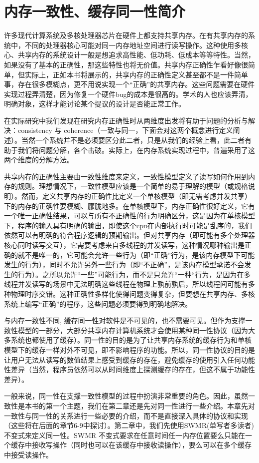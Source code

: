 \documentclass[UTF-8]{ctexrep}
\begin{document}
\chapter{内存一致性、缓存同一性简介}
许多现代计算系统及多核处理器芯片在硬件上都支持共享内存。在有共享内存的系统中，不同的处理器核心可能对同一内存地址空间进行读写操作。这种使用多核心、共享内存的系统设计一般是想追求高性能、低功耗、低成本等等特性。当然，如果没有了基本的正确性，那这些特性也将无价值。共享内存正确性乍看好像很简单，但实际上，正如本书将展示的，共享内存的正确性定义甚至都不是一件简单事，存在很多模糊点，更不用说实现一个“正确”的共享内存。这些问题需要在硬件实现过程弄清楚，因为修复一个硬件bug的成本是很高的。学术的人也应该弄清，明确对象，这样才能讨论某个提议的设计是否能正常工作。
\par 在实际研究中我们发现在研究内存正确性时从两维度出发将有助于问题的分析与解决：consistency 与 coherence（一致与同一，下面会对这两个概念进行定义阐述）。当然一个系统并不是必须要区分此二者，只是从我们的经验上看，此二者有助于我们将问题分解，各个击破。实际上，在内存系统实现过程中，普遍采用了这两个维度的分解方法。
\par 共享内存的正确性主要由一致性维度来定义，一致性模型定义了读写如何作用到内存的规则。理想情况下，一致性模型应该是一个简单的易于理解的模型（或规格说明）。然而，定义共享内存的正确性比定义一个单核模型（即无需考虑并发共享）下的内存的正确性要模糊、朦胧地多。在单核模型下，内存正确性很好定义，它有一个唯一正确性结果，可以与所有不正确性的行为明确区分，这是因为在单核模型下，程序的输入具有明确的输出，即使这个cpu在内部执行时可能是乱序的，我们依然可以有明确的符合程序逻辑的预期输出。但对共享内存（即可能有多个处理器核心同时读写交互），它需要考虑来自多线程的并发读写，这种情况哪种输出是正确的就不是唯一的，它可能会允许一些行为（即“正确”行为，是该内存模型下可能发生的行为），同时不允许另外一些行为（即“不正确”，是该内存模型承诺不会发生的行为）。之所以允许“一些”可能行为，而不是只允许“一种“行为，是因为在多线程并发读写的场景中无法明确这些线程在物理上孰前孰后，所以线程间可能有多种物理时序交错。这种正确性多样化使得问题变得复杂，但要想在共享内存、多核系统上编写“正确”的程序，这些问题必须要得到明确地解决。
\par 与内存一致性不同, 缓存同一性对软件是不可见的，也不需要可见。但作为支撑一致性模型的一部分，大部分共享内存计算机系统才会使用某种同一性协议（因为大多系统也都使用了缓存）。同一性的目的是为了让共享内存系统的缓存行为和单核模型下的缓存一样对外不可见，即不影响程序的功能。所以，同一性协议的目的是让用户无法从读写的数值结果上感受到缓存的存在，避免缓存的使用引入任何功能性差异（当然，程序员依然可以从时间维度上探测缓存的存在，但这不属于功能性差异）。
\par 一般来说，同一性在支撑一致性模型的过程中扮演非常重要的角色。因此，虽然一致性是本书的第一个主题，我们在第二章还是先对同一性进行一些介绍。本章先对一致性与同一性的关系进行一些必要的介绍，而不是直接深入具体的协议和实现（这些将在后面的章节6-9中探讨）。第二章中，我们先使用SWMR(单写者多读者) 不变式来定义同一性。SWMR 不变式要求在任意时间任一内存位置要么只能在一个缓存中接收写操作（同时也可以在该缓存中接收读操作），要么可以在多个缓存中接受读操作。
\end{document}
